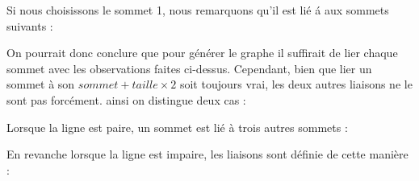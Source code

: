 \documentclass{report}
\begin{document}
			Si nous choisissons le sommet 1, nous remarquons qu'il est li\'e \'a aux sommets suivants :
			
			
			On pourrait donc conclure que pour générer le graphe il suffirait de lier chaque sommet avec les observations faites ci-dessus. Cependant, bien que lier un sommet à son $sommet+taille\times2$ soit toujours vrai, les deux autres liaisons ne le sont pas forcément. ainsi on distingue deux cas :
			
			
				
			Lorsque la ligne est paire, un sommet est lié à trois autres sommets :
				
				
			En revanche lorsque la ligne est impaire, les liaisons sont définie de cette manière : 
				
					
\end{document}
